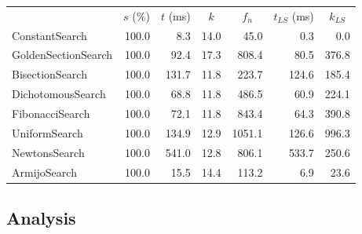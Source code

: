 \documentclass[a4paper,english,titlepage,12pt]{article}
\begin{document}
\begin{center}
\label{tab:performance_results_NE_HBM}
\begin{tabular}{|l|r|r|r|r|r|r|}
\hline
\rowcolor{gray!25}
\multicolumn{1}{|c|}{Line Search Name} & \multicolumn{1}{c|}{$s$ (\%)} & \multicolumn{1}{c|}{$t$ (ms)} & \multicolumn{1}{c|}{$k$} & \multicolumn{1}{c|}{$f_n$} & \multicolumn{1}{c|}{$t_{LS}$ (ms)} & \multicolumn{1}{c|}{$k_{LS}$} \\
ConstantSearch & 100.0 & 8.3 & 14.0 & 45.0 & 0.3 & 0.0 \\
GoldenSectionSearch & 100.0 & 92.4 & 17.3 & 808.4 & 80.5 & 376.8 \\
BisectionSearch & 100.0 & 131.7 & 11.8 & 223.7 & 124.6 & 185.4 \\
DichotomousSearch & 100.0 & 68.8 & 11.8 & 486.5 & 60.9 & 224.1 \\
FibonacciSearch & 100.0 & 72.1 & 11.8 & 843.4 & 64.3 & 390.8 \\
UniformSearch & 100.0 & 134.9 & 12.9 & 1051.1 & 126.6 & 996.3 \\
NewtonsSearch & 100.0 & 541.0 & 12.8 & 806.1 & 533.7 & 250.6 \\
ArmijoSearch & 100.0 & 15.5 & 14.4 & 113.2 & 6.9 & 23.6 \\
\hline
\end{tabular}
\end{center}


\subsection{Analysis}

\end{document}
